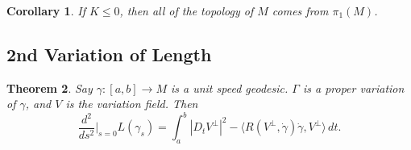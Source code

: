 \documentclass[11pt, a4paper]{article}
\theoremstyle{plain}
\newtheorem{theorem}{Theorem}[section]
\newtheorem{corollary}[theorem]{Corollary}
\theoremstyle{definition}
\theoremstyle{remark}
\begin{document}
{\begin{corollary}
If $K \le 0$, then all of the topology of $M$ comes from $\pi_1(M)$.
\end{corollary}

\subsection{2nd Variation of Length}

\begin{theorem}
Say $\gamma : [a,b] \to M$ is a unit speed geodesic. $\Gamma$ is a proper variation of $\gamma$, and $V$ is the variation field. Then 
\[
\frac{d^2}{ds^2}\bigg|_{s=0} L(\gamma_s) = \int_a^b |D_t V^\perp|^2 - \langle R(V^\perp, \dot{\gamma})\dot{\gamma}, V^\perp \rangle \, dt.
\]
\end{theorem}

}
\end{document}
